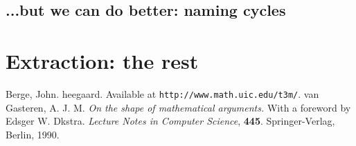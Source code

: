 \documentclass{article}%
\theoremstyle{plain}
\theoremstyle{plain}
\theoremstyle{definition}
\numberwithin{equation}{section}
\begin{document}
\subsection{...but we can do better: naming cycles}
\section{Extraction: the rest}
\begin{thebibliography}{9}
Berge, John. {\Tt{}heegaard\nwendquote}. Available at 
\texttt{http://www.math.uic.edu/t3m/}.
van Gasteren, A. J. M. \emph{On the shape of mathematical arguments.}
With a foreword by Edsger W. D{\ij}kstra. \emph{Lecture Notes in
Computer Science}, \textbf{445}. Springer-Verlag, Berlin, 1990.
\end{thebibliography}
\nwenddocs{}\nwdocspar
\end{document}
